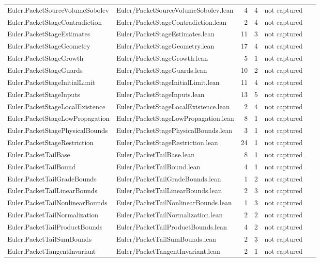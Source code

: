 \documentclass[10pt]{article}
\begin{document}
\begin{longtable}{p{0.28\linewidth}p{0.27\linewidth}r r p{0.20\linewidth}}
Euler.PacketSourceVolumeSobolev & Euler/PacketSourceVolumeSobolev.lean & 4 & 4 & not captured\\
Euler.PacketStageContradiction & Euler/PacketStageContradiction.lean & 2 & 4 & not captured\\
Euler.PacketStageEstimates & Euler/PacketStageEstimates.lean & 11 & 3 & not captured\\
Euler.PacketStageGeometry & Euler/PacketStageGeometry.lean & 17 & 4 & not captured\\
Euler.PacketStageGrowth & Euler/PacketStageGrowth.lean & 5 & 1 & not captured\\
Euler.PacketStageGuards & Euler/PacketStageGuards.lean & 10 & 2 & not captured\\
Euler.PacketStageInitialLimit & Euler/PacketStageInitialLimit.lean & 11 & 4 & not captured\\
Euler.PacketStageInputs & Euler/PacketStageInputs.lean & 13 & 5 & not captured\\
Euler.PacketStageLocalExistence & Euler/PacketStageLocalExistence.lean & 2 & 4 & not captured\\
Euler.PacketStageLowPropagation & Euler/PacketStageLowPropagation.lean & 8 & 1 & not captured\\
Euler.PacketStagePhysicalBounds & Euler/PacketStagePhysicalBounds.lean & 3 & 1 & not captured\\
Euler.PacketStageRestriction & Euler/PacketStageRestriction.lean & 24 & 1 & not captured\\
Euler.PacketTailBase & Euler/PacketTailBase.lean & 8 & 1 & not captured\\
Euler.PacketTailBound & Euler/PacketTailBound.lean & 4 & 1 & not captured\\
Euler.PacketTailGradeBounds & Euler/PacketTailGradeBounds.lean & 1 & 2 & not captured\\
Euler.PacketTailLinearBounds & Euler/PacketTailLinearBounds.lean & 2 & 3 & not captured\\
Euler.PacketTailNonlinearBounds & Euler/PacketTailNonlinearBounds.lean & 1 & 3 & not captured\\
Euler.PacketTailNormalization & Euler/PacketTailNormalization.lean & 2 & 2 & not captured\\
Euler.PacketTailProductBounds & Euler/PacketTailProductBounds.lean & 4 & 2 & not captured\\
Euler.PacketTailSumBounds & Euler/PacketTailSumBounds.lean & 2 & 3 & not captured\\
Euler.PacketTangentInvariant & Euler/PacketTangentInvariant.lean & 2 & 1 & not captured\\

\end{longtable}
\end{document}
